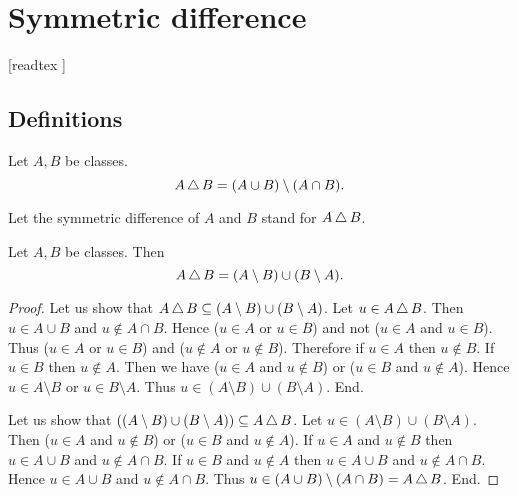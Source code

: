 \documentclass[../../set-theory/set-theory.tex]{subfiles}
\begin{document}
  \chapter{Symmetric difference}\label{symmetric-difference}


  \begin{forthel}

    [readtex ]

  \end{forthel}


  \section{Definitions}

  \begin{forthel}
    \begin{definition}
      Let $A, B$ be classes.
      \[ A \mathop{\triangle} B = (A \cup B) \setminus (A \cap B). \]
    \end{definition}

    Let the symmetric difference of $A$ and $B$ stand for $A \mathop{\triangle} B$.
  \end{forthel}

  \begin{forthel}
    \begin{proposition}
      Let $A, B$ be classes.
      Then \[ A \mathop{\triangle} B = (A \setminus B) \cup (B \setminus A). \]
    \end{proposition}
    \begin{proof}
      Let us show that $A \mathop{\triangle} B \subseteq (A \setminus B) \cup (B \setminus A)$.
        Let $u \in A \mathop{\triangle} B$.
        Then $u \in A \cup B$ and $u \notin A \cap B$.
        Hence ($u \in A$ or $u \in B$) and not ($u \in A$ and $u \in B$).
        Thus ($u \in A$ or $u \in B$) and ($u \notin A$ or $u \notin B$).
        Therefore if $u \in A$ then $u \notin B$.
        If $u \in B$ then $u \notin A$.
        Then we have ($u \in A$ and $u \notin B$) or ($u \in B$ and $u \notin A$).
        Hence $u \in A \setminus B$ or $u \in B \setminus A$.
        Thus $u \in (A \setminus B) \cup (B \setminus A)$.
      End.

      Let us show that $((A \setminus B) \cup (B \setminus A)) \subseteq A \mathop{\triangle} B$. %
        Let $u \in (A \setminus B) \cup (B \setminus A)$.
        Then ($u \in A$ and $u \notin B$) or ($u \in B$ and $u \notin A$).
        If $u \in A$ and $u \notin B$ then $u \in A \cup B$ and $u \notin A \cap B$.
        If $u \in B$ and $u \notin A$ then $u \in A \cup B$ and $u \notin A \cap B$.
        Hence $u \in A \cup B$ and $u \notin A \cap B$.
        Thus $u \in (A \cup B) \setminus (A \cap B) = A \mathop{\triangle} B$.
      End.
    \end{proof}
  \end{forthel}
\end{document}
